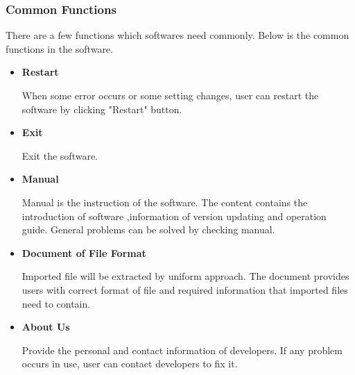 \documentclass[11pt,oneside,a4paper]{article}
\begin{document}
    \subsubsection{Common Functions}
   There are a few functions which softwares need commonly. Below is the common functions in the software.

      \begin{itemize}
        \item \textbf{Restart}

        When some error occurs or some setting changes, user can restart the software by clicking "Restart" button.
        \item \textbf{Exit}

        Exit the software.
        \item \textbf{Manual}

        Manual is the instruction of the software. The content contains the introduction of software ,information of version updating and operation guide. General problems can be solved by checking manual.
        \item \textbf{Document of File Format}

         Imported file will be extracted by uniform approach. The document provides users with correct format of file and required information that imported files need to contain.
        \item \textbf{About Us}

        Provide the personal and contact information of developers. If any problem occurs in use, user can contact developers to fix it.
     \end{itemize}
\end{document}
